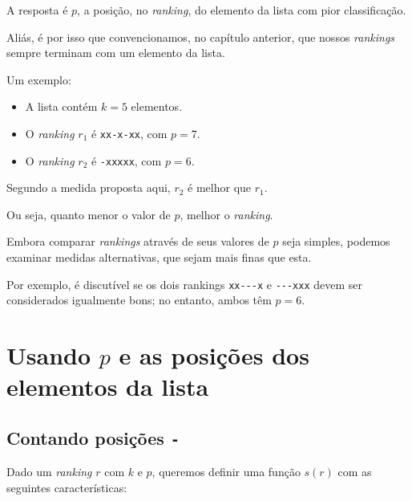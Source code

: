 \documentclass[
  letterpaper,
  DIV=11,
  numbers=noendperiod]{scrreprt}
\begin{document}
A resposta é $p$, a posição, no \emph{ranking}, do elemento da lista com
pior classificação.

Aliás, é por isso que convencionamos, no capítulo anterior, que nossos
\emph{rankings} sempre terminam com um elemento da lista.

Um exemplo:

\begin{itemize}
\item
  A lista contém $k = 5$ elementos.
\item
  O \emph{ranking} $r_1$ é \texttt{xx-x-xx}, com $p = 7$.
\item
  O \emph{ranking} $r_2$ é \texttt{-xxxxx}, com $p = 6$.
\end{itemize}

Segundo a medida proposta aqui, $r_2$ é melhor que $r_1$.

Ou seja, quanto menor o valor de $p$, melhor o \emph{ranking}.

Embora comparar \emph{rankings} através de seus valores de $p$ seja
simples, podemos examinar medidas alternativas, que sejam mais finas que
esta.

Por exemplo, é discutível se os dois rankings \texttt{xx-\/-\/-x} e
\texttt{-\/-\/-xxx} devem ser considerados igualmente bons; no entanto,
ambos têm $p = 6$.

\section{\texorpdfstring{Usando $p$ e as posições dos elementos da
lista}{Usando  e as posições dos elementos da lista}}\label{usando-p-e-as-posiuxe7uxf5es-dos-elementos-da-lista}

\subsection{\texorpdfstring{Contando posições
\texttt{-}}{Contando posições -}}\label{contando-posiuxe7uxf5es--}

Dado um \emph{ranking} $r$ com $k$ e $p$, queremos definir uma função
$s(r)$ com as seguintes características:
\end{document}
